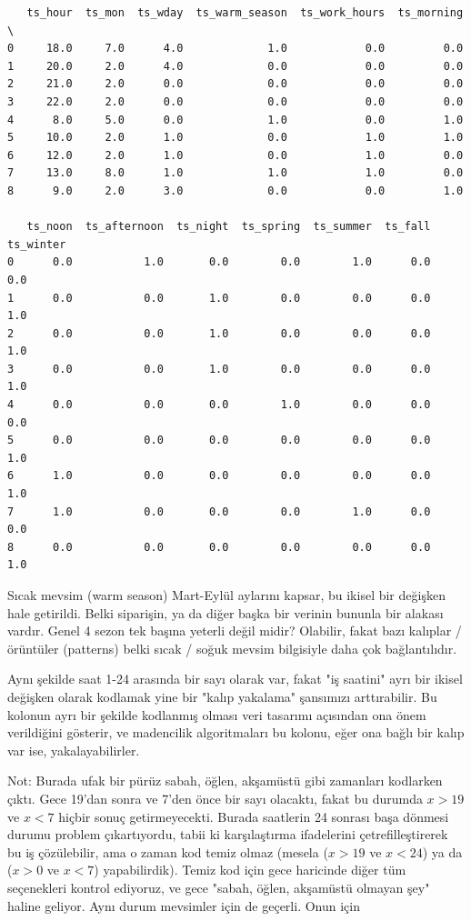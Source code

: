 \documentclass[12pt,fleqn]{article}\usepackage{../../common}
\begin{document}
\begin{verbatim}
   ts_hour  ts_mon  ts_wday  ts_warm_season  ts_work_hours  ts_morning  \
0     18.0     7.0      4.0             1.0            0.0         0.0   
1     20.0     2.0      4.0             0.0            0.0         0.0   
2     21.0     2.0      0.0             0.0            0.0         0.0   
3     22.0     2.0      0.0             0.0            0.0         0.0   
4      8.0     5.0      0.0             1.0            0.0         1.0   
5     10.0     2.0      1.0             0.0            1.0         1.0   
6     12.0     2.0      1.0             0.0            1.0         0.0   
7     13.0     8.0      1.0             1.0            1.0         0.0   
8      9.0     2.0      3.0             0.0            0.0         1.0   

   ts_noon  ts_afternoon  ts_night  ts_spring  ts_summer  ts_fall  ts_winter  
0      0.0           1.0       0.0        0.0        1.0      0.0        0.0  
1      0.0           0.0       1.0        0.0        0.0      0.0        1.0  
2      0.0           0.0       1.0        0.0        0.0      0.0        1.0  
3      0.0           0.0       1.0        0.0        0.0      0.0        1.0  
4      0.0           0.0       0.0        1.0        0.0      0.0        0.0  
5      0.0           0.0       0.0        0.0        0.0      0.0        1.0  
6      1.0           0.0       0.0        0.0        0.0      0.0        1.0  
7      1.0           0.0       0.0        0.0        1.0      0.0        0.0  
8      0.0           0.0       0.0        0.0        0.0      0.0        1.0  
\end{verbatim}

Sıcak mevsim (warm season) Mart-Eylül aylarını kapsar, bu ikisel bir
değişken hale getirildi. Belki siparişin, ya da diğer başka bir verinin
bununla bir alakası vardır. Genel 4 sezon tek başına yeterli değil midir?
Olabilir, fakat bazı kalıplar / örüntüler (patterns) belki sıcak / soğuk
mevsim bilgisiyle daha çok bağlantılıdır. 

Aynı şekilde saat 1-24 arasında bir sayı olarak var, fakat "iş saatini"
ayrı bir ikisel değişken olarak kodlamak yine bir "kalıp yakalama"
şansımızı arttırabilir. Bu kolonun ayrı bir şekilde kodlanmış olması veri
tasarımı açısından ona önem verildiğini gösterir, ve madencilik
algoritmaları bu kolonu, eğer ona bağlı bir kalıp var ise,
yakalayabilirler.

Not: Burada ufak bir pürüz sabah, öğlen, akşamüstü gibi zamanları kodlarken
çıktı. Gece 19'dan sonra ve 7'den önce bir sayı olacaktı, fakat bu durumda
$x>19$ ve $x<7$ hiçbir sonuç getirmeyecekti. Burada saatlerin 24 sonrası başa
dönmesi durumu problem çıkartıyordu, tabii ki karşılaştırma ifadelerini
çetrefilleştirerek bu iş çözülebilir, ama o zaman kod temiz olmaz (mesela
($x>19$ ve $x<24$) ya da ($x>0$ ve $x<7$) yapabilirdik). Temiz kod için gece
haricinde diğer tüm seçenekleri kontrol ediyoruz, ve gece "sabah, öğlen,
akşamüstü olmayan şey" haline geliyor. Aynı durum mevsimler için de
geçerli. Onun için 
\end{document}

